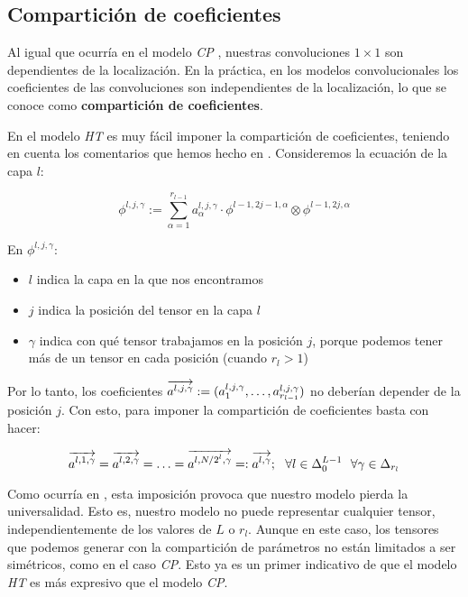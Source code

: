 \subsection{Compartición de coeficientes}

Al igual que ocurría en el modelo \textit{CP} , nuestras convoluciones $1 \times 1$ son dependientes de la localización. En la práctica, en los modelos convolucionales los coeficientes de las convoluciones son independientes de la localización, lo que se conoce como \textbf{compartición de coeficientes}.

En el modelo \textit{HT} es muy fácil imponer la compartición de coeficientes, teniendo en cuenta los comentarios que hemos hecho en . Consideremos la ecuación de la capa $l$:

\begin{equation}
	\phi^{l, j, \gamma} := \sum_{\alpha = 1}^{r_{l-1}} a_{\alpha}^{l, j, \gamma} \cdot \phi^{l-1, 2j-1, \alpha} \otimes \phi^{l-1, 2j, \alpha}
\end{equation}

En $\phi^{l, j, \gamma}$:

\begin{itemize}
	\item $l$ indica la capa en la que nos encontramos
	\item $j$ indica la posición del tensor en la capa $l$
	\item $\gamma$ indica con qué tensor trabajamos en la posición $j$, porque podemos tener más de un tensor en cada posición (cuando $r_l > 1$)
\end{itemize}

Por lo tanto, los coeficientes $\overrightarrow{a^{l, j, \gamma}} := (a^{l, j, \gamma}_1, \ldots, a^{l, j, \gamma}_{r_{l-1}})$ no deberían depender de la posición $j$. Con esto, para imponer la compartición de coeficientes basta con hacer:

\begin{equation}
	\overrightarrow{a^{l, 1, \gamma}} = \overrightarrow{a^{l, 2, \gamma}} = \ldots = \overrightarrow{a^{l, N/2^l, \gamma}} =: \overrightarrow{a^{l, \gamma}}; \ \  \forall l \in \Delta_{0}^{L - 1} \ \  \forall \gamma \in \Delta_{r_l}
\end{equation}

Como ocurría en , esta imposición provoca que nuestro modelo pierda la universalidad. Esto es, nuestro modelo no puede representar cualquier tensor, independientemente de los valores de $L$ o $r_l$. Aunque en este caso, los tensores que podemos generar con la compartición de parámetros no están limitados a ser simétricos, como en el caso \textit{CP}. Esto ya es un primer indicativo de que el modelo \textit{HT} es más expresivo que el modelo \textit{CP}.

